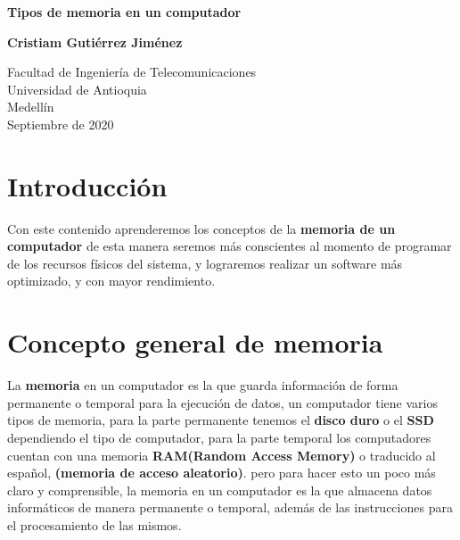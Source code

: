\documentclass{article}
\begin{document}
\begin{titlepage}
    \begin{center}
        \vspace*{1cm}
            
        \Huge
        \textbf{Tipos de memoria en un computador}
            
        \vspace{0.5cm}
        \LARGE
        
            
        \vspace{1.5cm}
            
        \textbf{Cristiam Gutiérrez Jiménez}
            
        \vfill
            
        \vspace{0.8cm}
            
        \Large
        Facultad de Ingeniería de Telecomunicaciones\\
        Universidad de Antioquia\\
        Medellín\\
        Septiembre de 2020
            
    \end{center}
\end{titlepage}

\tableofcontents

\section{Introducción}
Con este contenido aprenderemos los conceptos de la \textbf{memoria de un computador} de esta manera seremos más conscientes al momento de programar de los recursos físicos del sistema, y lograremos realizar un software más optimizado, y con mayor rendimiento. 

\section{Concepto general de memoria} 

La \textbf{memoria} en un computador es la que guarda información de forma permanente o temporal para la ejecución de datos, un computador tiene varios tipos de memoria, para la parte permanente tenemos el \textbf{disco duro}  o el \textbf{SSD} dependiendo el tipo de computador, para la parte temporal los computadores cuentan con una memoria \textbf{RAM(Random Access Memory)} o traducido al español, \textbf{(memoria de acceso aleatorio)}\cite{tedwebsite}.  pero para hacer esto un poco más claro y comprensible, la memoria en un computador es la que almacena datos informáticos de manera permanente o temporal, además de las instrucciones para el procesamiento de las mismos.
\end{document}

